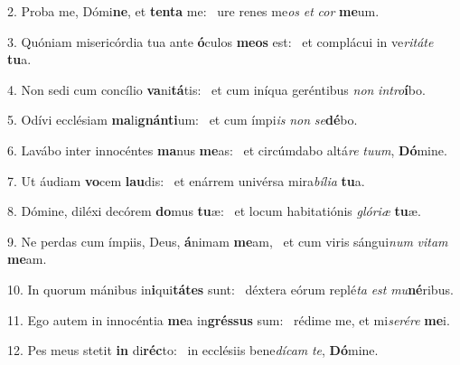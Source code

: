 2. Proba me, Dómi\textbf{ne}, et \textbf{ten}\textbf{ta} me: \ast\  ure renes me\textit{os} \textit{et} \textit{cor} \textbf{me}um.\

3. Quóniam misericórdia tua ante \textbf{ó}culos \textbf{me}\textbf{os} est: \ast\  et complácui in ve\textit{ri}\textit{tá}\textit{te} \textbf{tu}a.\

4. Non sedi cum concílio \textbf{va}ni\textbf{tá}tis: \ast\  et cum iníqua geréntibus \textit{non} \textit{in}\textit{tro}\textbf{í}bo.\

5. Odívi ecclésiam \textbf{ma}li\textbf{gnán}\textbf{ti}um: \ast\  et cum ímpi\textit{is} \textit{non} \textit{se}\textbf{dé}bo.\

6. Lavábo inter innocéntes \textbf{ma}nus \textbf{me}as: \ast\  et circúmdabo altá\textit{re} \textit{tu}\textit{um}, \textbf{Dó}mine.\

7. Ut áudiam \textbf{vo}cem \textbf{lau}dis: \ast\  et enárrem univérsa mira\textit{bí}\textit{li}\textit{a} \textbf{tu}a.\

8. Dómine, diléxi decórem \textbf{do}mus \textbf{tu}æ: \ast\  et locum habitatiónis \textit{gló}\textit{ri}\textit{æ} \textbf{tu}æ.\

9. Ne perdas cum ímpiis, Deus, \textbf{á}nimam \textbf{me}am, \ast\  et cum viris sángui\textit{num} \textit{vi}\textit{tam} \textbf{me}am.\

10. In quorum mánibus in\textbf{i}qui\textbf{tá}\textbf{tes} sunt: \ast\  déxtera eórum replé\textit{ta} \textit{est} \textit{mu}\textbf{né}ribus.\

11. Ego autem in innocéntia \textbf{me}a in\textbf{grés}\textbf{sus} sum: \ast\  rédime me, et mi\textit{se}\textit{ré}\textit{re} \textbf{me}i.\

12. Pes meus stetit \textbf{in} di\textbf{réc}to: \ast\  in ecclésiis bene\textit{dí}\textit{cam} \textit{te}, \textbf{Dó}mine.\


